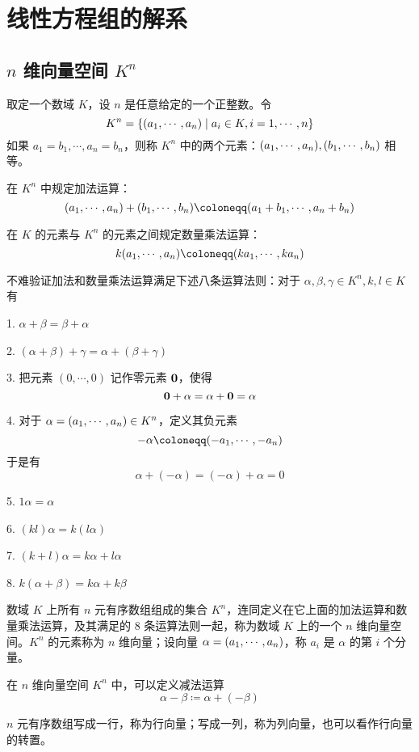\chapter{线性方程组的解系}

\section{\texorpdfstring{$n$ 维向量空间 $K^n$}{n 维向量空间 Kn}}

取定一个数域 $K$，设 $n$ 是任意给定的一个正整数。令
\[K^n=\{(a_1,\cdots,a_n) \mid a_i\in K,i=1,\cdots,n\}\]
如果 $a_1=b_1,\cdots,a_n=b_n$，则称 $K^n$ 中的两个元素：$(a_1,\cdots,a_n),(b_1,\cdots,b_n)$ 相等。

在 $K^n$ 中规定加法运算：
\[(\seq{a}{n})+(\seq{b}{n})\coloneqq (a_1+b_1,\cdots,a_n+b_n)\]

在 $K$ 的元素与 $K^n$ 的元素之间规定数量乘法运算：
\[k(\seq{a}{n}) \coloneqq  (\seq{ka}{n})\]

不难验证加法和数量乘法运算满足下述八条运算法则：对于 $\alpha,\beta,\gamma\in K^n,k,l\in K$ 有

1. $\alpha+\beta=\beta+\alpha$

2. $(\alpha+\beta)+\gamma=\alpha+(\beta+\gamma)$

3. 把元素 $(0,\cdots,0)$ 记作零元素 $\boldsymbol{0}$，使得
\[\boldsymbol{0} + \alpha = \alpha + \boldsymbol{0} = \alpha\]

4. 对于 $\alpha = (a_1,\cdots,a_n)\in K^n$，定义其负元素
\[-\alpha \coloneqq  (\seq{-a}{n})\]
于是有
\[\alpha + (-\alpha) = (-\alpha)+\alpha = 0\]

5. $1\alpha = \alpha$

6. $(kl)\alpha = k(l\alpha)$

7. $(k+l)\alpha = k\alpha + l\alpha$

8. $k (\alpha+\beta) = k\alpha + k\beta$

\begin{definition}[$n$ 维向量空间]
	数域 $K$ 上所有 $n$ 元有序数组组成的集合 $K^n$，连同定义在它上面的加法运算和数量乘法运算，及其满足的 8 条运算法则一起，称为数域 $K$ 上的一个 $n$ 维向量空间。$K^n$ 的元素称为 $n$ 维向量；设向量 $\alpha  = (a_1,\cdots,a_n)$，称 $a_i$ 是 $\alpha$ 的第 $i$ 个分量。
\end{definition}

在 $n$ 维向量空间 $K^n$ 中，可以定义减法运算
\[\alpha - \beta \coloneqq  \alpha + (-\beta)\]

$n$ 元有序数组写成一行，称为行向量；写成一列，称为列向量，也可以看作行向量的转置。

